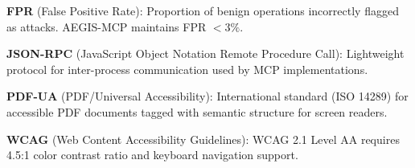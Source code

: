\noindent\textbf{FPR} (False Positive Rate): Proportion of benign operations incorrectly flagged as attacks. AEGIS-MCP maintains FPR $<3\%$.

\noindent\textbf{JSON-RPC} (JavaScript Object Notation Remote Procedure Call): Lightweight protocol for inter-process communication used by MCP implementations.

\noindent\textbf{PDF-UA} (PDF/Universal Accessibility): International standard (ISO 14289) for accessible PDF documents tagged with semantic structure for screen readers.

\noindent\textbf{WCAG} (Web Content Accessibility Guidelines): WCAG 2.1 Level AA requires 4.5:1 color contrast ratio and keyboard navigation support.
